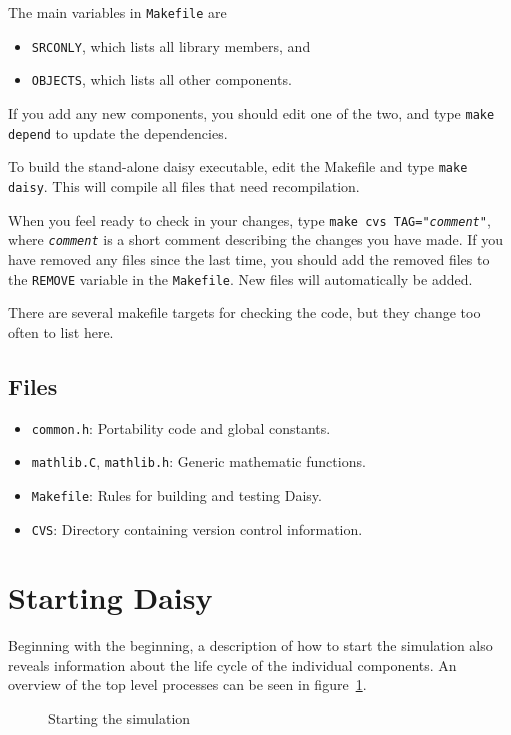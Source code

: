 \documentclass{article}
\newcommand{\code}[1]{\texttt{#1}}
\newcommand{\file}[1]{\texttt{#1}}
\begin{document}
The main variables in \file{Makefile} are
\begin{itemize}
\item \code{SRCONLY}, which lists all library members, and
\item \code{OBJECTS}, which lists all other components.
\end{itemize}
If you add any new components, you should edit one of the two, and
type \texttt{make depend} to update the dependencies.

To build the stand-alone daisy executable, edit the Makefile and type
\texttt{make daisy}.  This will compile all files that need
recompilation. 

When you feel ready to check in your changes, type \texttt{make cvs
  TAG="\textit{comment}"}, where \texttt{\textit{comment}} is a short
comment describing the changes you have made.  If you have removed any
files since the last time, you should add the removed files to the
\code{REMOVE} variable in the \file{Makefile}.  New files will
automatically be added.

There are several makefile targets for checking the code, but they
change too often to list here.

\subsection{Files}

\begin{itemize}
\item \file{common.h}: Portability code and global constants.
\item \file{mathlib.C}, \file{mathlib.h}: Generic mathematic
  functions.  
\item \file{Makefile}: Rules for building and testing Daisy.
\item \file{CVS}: Directory containing version control information.
\end{itemize}

\section{Starting Daisy}

Beginning with the beginning, a description of how to start the
simulation also reveals information about the life cycle of the
individual components.  An overview of the top level processes can be
seen in figure~\ref{fig:start}.

\begin{figure}[htbp]
  \begin{center}
  \end{center}
  \caption{Starting the simulation}
  \label{fig:start}
\end{figure}
\end{document}
